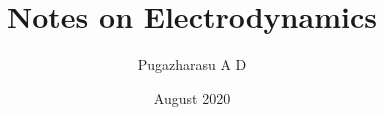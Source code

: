 \documentclass[a4paper,12pt]{book}
\begin{document}
\author{Pugazharasu A D}
\title{Notes on Electrodynamics}
\date{August 2020}

\frontmatter
\maketitle
\tableofcontents

\mainmatter








\backmatter
\end{document}
